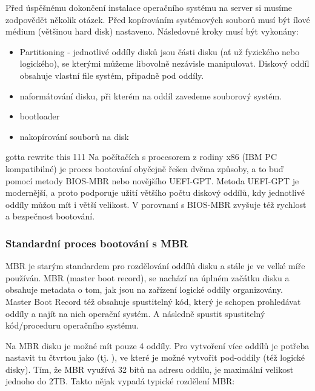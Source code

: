 \documentclass[thesis=B,czech]{FITthesis}[2012/06/26]
\begin{document}
Před úspěšnému dokončení instalace operačního systému na server si musíme zodpovědět několik otázek. Před kopírováním systémových souborů musí být ílové médium (většinou hard disk) nastaveno. Následovné kroky musí být vykonány:

\begin{itemize}

\item Partitioning - jednotlivé oddíly disků jsou části disku (ať už fyzického nebo logického), se kterými můžeme libovolně nezávisle manipulovat. Diskový oddíl obsahuje vlastní file systém, připadně pod oddíly.
\item naformátování disku, při kterém na oddíl zavedeme souborový systém.
\item bootloader
\item nakopírování souborů na disk
\end{itemize}


 gotta rewrite this 111
Na počítačích s procesorem z rodiny x86 (IBM PC kompatibilné) je proces bootování obyčejně řešen dvěma způsoby, a to buď pomocí metody BIOS-MBR nebo novějšího UEFI-GPT. Metoda UEFI-GPT je modernější, a proto podporuje užití většího počtu diskový oddílů, kdy jednotlivé oddíly můžou mít i větší velikost. V porovnaní s BIOS-MBR zvyšuje též rychlost a bezpečnost bootování.

\subsubsection{Standardní proces bootování s MBR}


MBR je starým standardem pro rozdělování oddílů disku a stále je ve velké míře používán. MBR (master boot record), se nachází na úplném začátku disku a obsahuje metadata o tom, jak jsou na zařízení logické oddíly organizovány. Master Boot Record též obsahuje spustitelný kód, který je schopen prohledávat oddíly a najít na nich operační systém. A následně spustit spustitelný kód/proceduru operačního systému.


Na MBR disku je možné mít pouze 4 oddíly. Pro vytvoření více oddílů je potřeba nastavit tu čtvrtou jako   (tj. ), ve které je možné vytvořit pod-oddíly (též logické disky). Tím, že MBR využívá 32 bitů na adresu oddílu, je maximální velikost jednoho do 2TB. Takto nějak vypadá typické rozdělení MBR:
\end{document}
